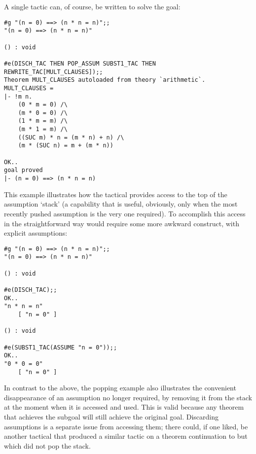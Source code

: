 \noindent A single tactic can, of course, be written to solve the goal:

\setcounter{sessioncount}{1}
\begin{session}\begin{verbatim}
#g "(n = 0) ==> (n * n = n)";;
"(n = 0) ==> (n * n = n)"

() : void

#e(DISCH_TAC THEN POP_ASSUM SUBST1_TAC THEN REWRITE_TAC[MULT_CLAUSES]);;
Theorem MULT_CLAUSES autoloaded from theory `arithmetic`.
MULT_CLAUSES =
|- !m n.
    (0 * m = 0) /\
    (m * 0 = 0) /\
    (1 * m = m) /\
    (m * 1 = m) /\
    ((SUC m) * n = (m * n) + n) /\
    (m * (SUC n) = m + (m * n))

OK..
goal proved
|- (n = 0) ==> (n * n = n)
\end{verbatim}\end{session}

This example illustrates how the tactical  provides
access
to the top of the assumption `stack' (a capability that
is useful, obviously, only when the
most recently pushed assumption is the very one required).
To accomplish this access in the straightforward way would
require some more awkward
\index{assumptions!explicit} construct, with explicit assumptions:

\setcounter{sessioncount}{1}
\begin{session}\begin{verbatim}
#g "(n = 0) ==> (n * n = n)";;
"(n = 0) ==> (n * n = n)"

() : void

#e(DISCH_TAC);;
OK..
"n * n = n"
    [ "n = 0" ]

() : void

#e(SUBST1_TAC(ASSUME "n = 0"));;
OK..
"0 * 0 = 0"
    [ "n = 0" ]
\end{verbatim}\end{session}

In contrast to the above, the popping example also illustrates the
convenient disappearance of an assumption no longer required, by removing it
from the stack at the moment when it is accessed and used. This is valid
because any theorem that achieves the subgoal
will still achieve the original goal. Discarding assumptions
is a separate issue from accessing them;
there could, if one liked, be another
tactical that produced a similar tactic on a theorem continuation
to \ml{POP\_ASSUM} but which did not pop the
stack.

